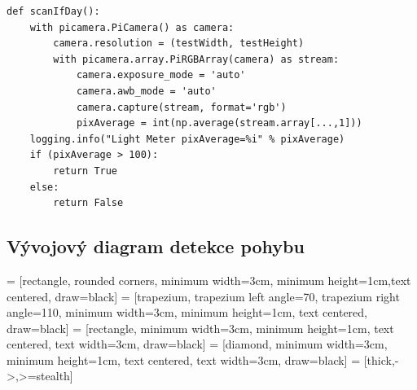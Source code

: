 \begin{verbatim}
def scanIfDay():
    with picamera.PiCamera() as camera:
        camera.resolution = (testWidth, testHeight)
        with picamera.array.PiRGBArray(camera) as stream:
            camera.exposure_mode = 'auto'
            camera.awb_mode = 'auto'
            camera.capture(stream, format='rgb')
            pixAverage = int(np.average(stream.array[...,1]))
    logging.info("Light Meter pixAverage=%i" % pixAverage)
    if (pixAverage > 100):
        return True
    else:
        return False
\end{verbatim}




\subsection*{Vývojový diagram detekce pohybu}

\usetikzlibrary{positioning, shapes.geometric, arrows}

 = [rectangle, rounded corners, minimum width=3cm, minimum height=1cm,text centered, draw=black]
 = [trapezium, trapezium left angle=70, trapezium right angle=110, minimum width=3cm, minimum height=1cm, text centered, draw=black]
 = [rectangle, minimum width=3cm, minimum height=1cm, text centered, text width=3cm, draw=black]
 = [diamond, minimum width=3cm, minimum height=1cm, text centered, text width=3cm, draw=black]
 = [thick,->,>=stealth]



